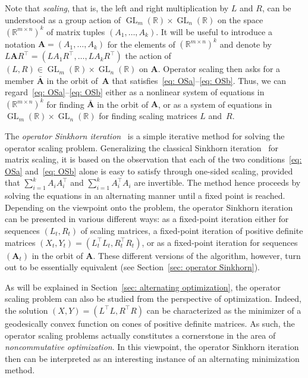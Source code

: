 \documentclass[a4paper]{article}
\newcommand{\R}{\mathbb{R}}
\newcommand{\bA}{\mathbf{A}}
\DeclareMathOperator{\GL}{GL}
\theoremstyle{definition}
\numberwithin{equation}{section}
\begin{document}
Note that \emph{scaling}, that is, the left and right multiplication by $L$ and $R$, can be understood as a group action of $\GL_m(\R) \times \GL_n(\R)$ on the space $(\R^{m \times n})^k$ of matrix tuples $(A_1,\dots,A_k)$. It will be useful to introduce a notation $\bA = (A_1,\dots,A_k)$ for the elements of $(\R^{m \times n})^k$ and denote by $
L \bA R^\top = (L A_1 R^\top, \dots, L A_k R^\top)$ the action of $(L,R) \in \GL_m(\R) \times \GL_n(\R)$ on $\bA$. Operator scaling then asks for a member $\bar{\bA}$ in the orbit of~$\bA$ that satisfies~\eqref{eq: OSa}--\eqref{eq: OSb}. Thus, we can regard~\eqref{eq: OSa}--\eqref{eq: OSb} either as a nonlinear system of equations in $(\R^{m \times n})^k$ for finding $\bar{\bA}$ in the orbit of $\bA$, or as a system of equations in $\GL_m(\R) \times \GL_n(\R)$ for finding scaling matrices $L$ and~$R$.

The \emph{operator Sinkhorn iteration}~\cite{Gurvits2004} is a simple iterative method for solving the operator scaling problem. Generalizing the classical Sinkhorn iteration~\cite{Sinkhorn1967} for matrix scaling, it is based on the observation that each of the two conditions~\eqref{eq: OSa} and~\eqref{eq: OSb} alone is easy to satisfy through one-sided scaling, provided that $\sum_{i=1}^k A_i A_i^\top$ and $\sum_{i=1}^k A_i^\top A_i$ are invertible. The method hence proceeds by solving the equations in an alternating manner until a fixed point is reached. Depending on the viewpoint onto the problem, the operator Sinkhorn iteration can be presented in various different ways: as a fixed-point iteration either for sequences $(L_t,R_t)$ of scaling matrices, a fixed-point iteration of positive definite matrices $(X_t, Y_t) = (L_t^\top L_t^{}, R_t^\top R_t^{})$, or as a fixed-point iteration for sequences $(\bA_t)$ in the orbit of $\bA$. These different versions of the algorithm, however, turn out to be essentially equivalent (see Section~\ref{sec: operator Sinkhorn}).

As will be explained in Section~\ref{sec: alternating optimization}, the operator scaling problem can also be studied from the perspective of optimization. Indeed, the solution $(X,Y) = (L^\top L, R^\top R)$ can be characterized as the minimizer of a geodesically convex function on cones of positive definite matrices. As such, the operator scaling problems actually constitutes a cornerstone in the area of \emph{noncommutative optimization}. In this viewpoint, the operator Sinkhorn iteration then can be interpreted as an interesting instance of an alternating minimization method.
\end{document}
